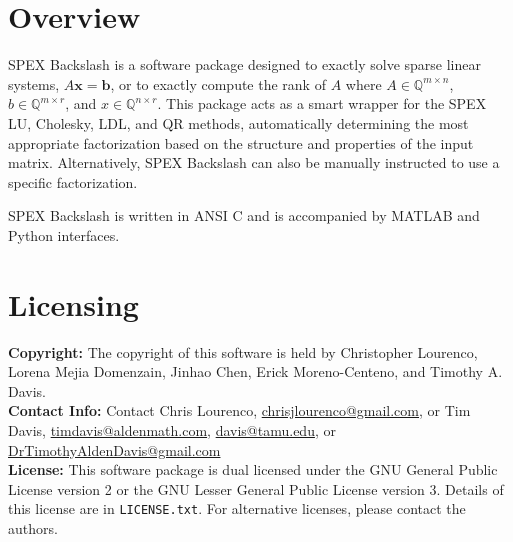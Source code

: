 \documentclass[12pt,oneside]{book}
\theoremstyle{definition}
\renewcommand{\b}{\mathbf{b}}
\newcommand{\x}{\mathbf{x}}
\begin{document}
\section{Overview} \label{s:Backslash:intro}
SPEX Backslash is a software package designed to exactly solve sparse linear 
systems, $A \x = \b$, or to exactly compute the rank of $A$ where $A \in
\mathbb{Q}^{m \times n}$, $b \in \mathbb{Q}^{m \times r}$, and $x \in
\mathbb{Q}^{n \times r}$.  This package acts as a smart wrapper for the SPEX
LU, Cholesky, LDL, and QR methods, automatically determining the most
appropriate factorization based on the structure and properties of the input
matrix. Alternatively, SPEX Backslash can also be manually instructed to use a
specific factorization.

SPEX Backslash is written in ANSI C and is accompanied by MATLAB and Python
interfaces.

\section{Licensing} \label{s:Backslash:licensing}
\textbf{Copyright:} The copyright of this software is held by  Christopher
Lourenco, Lorena Mejia Domenzain, Jinhao Chen, Erick Moreno-Centeno, and
Timothy A. Davis.\\

\noindent \textbf{Contact Info:} Contact Chris Lourenco,
\href{mailto:chrisjlourenco@gmail.com}{chrisjlourenco@gmail.com}, or Tim Davis,
\href{mailto:timdavis@aldenmath.com}{timdavis@aldenmath.com},
\href{mailto:davis@tamu.edu}{davis@tamu.edu}, or
\href{mailto:DrTimothyAldenDavis@gmail.com}{DrTimothyAldenDavis@gmail.com}\\

\noindent \textbf{License:} This software package is dual licensed under the
GNU General Public License version 2 or the GNU Lesser General Public License
version 3. Details of this license are in \verb|LICENSE.txt|. For
alternative licenses, please contact the authors.

\newpage
\end{document}
